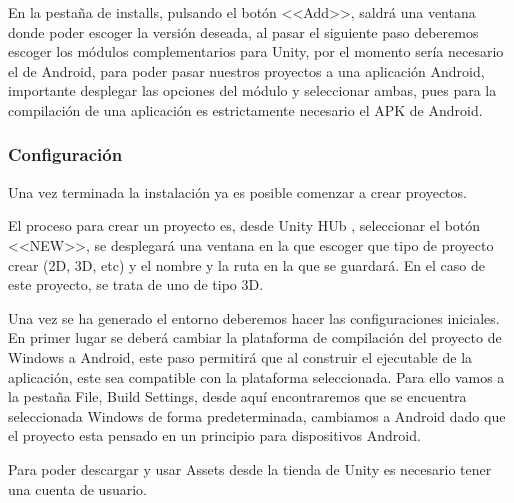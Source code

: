 En la pestaña de installs, pulsando el botón <<Add>>, saldrá una ventana donde poder escoger la versión deseada, al pasar el siguiente paso deberemos escoger los módulos complementarios para Unity, por el momento sería necesario el de Android, para poder pasar nuestros proyectos a una aplicación Android, importante desplegar las opciones del módulo y seleccionar ambas, pues para la compilación de una aplicación es estrictamente necesario el APK de Android.

\label{sub:Confi}\subsubsection{Configuración }

Una vez terminada la instalación ya es posible comenzar a crear proyectos. 

El proceso para crear un proyecto es, desde Unity HUb , seleccionar el botón <<NEW>>, se desplegará una ventana en la que escoger que tipo de proyecto crear (2D, 3D, etc) y  el nombre y la ruta en la que se guardará. En el caso de este proyecto, se trata de uno de tipo 3D.

Una vez se ha generado el entorno deberemos hacer las configuraciones iniciales. En primer lugar se deberá cambiar la plataforma de compilación del proyecto de Windows a Android, este paso permitirá que al construir el ejecutable de la aplicación, este sea compatible con la plataforma seleccionada. 
Para ello vamos a la pestaña File, Build Settings, desde aquí encontraremos que se encuentra seleccionada Windows de forma predeterminada, cambiamos a Android dado que el proyecto esta pensado en un principio para dispositivos Android.

Para poder descargar y usar Assets desde la tienda de Unity es necesario tener una cuenta de usuario.

